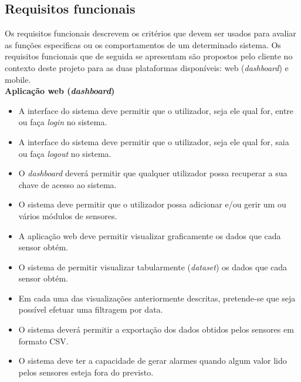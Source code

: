 \subsection{Requisitos funcionais}


Os requisitos funcionais descrevem os critérios que devem ser usados para avaliar as funções especificas ou os comportamentos de um determinado sistema. Os requisitos funcionais que de seguida se apresentam são propostos pelo cliente no contexto deste projeto para as duas plataformas disponíveis: web (\textit{dashboard}) e mobile. \\


\textbf{Aplicação web (\textit{dashboard})}


\begin{itemize}
	\item A interface do sistema deve permitir que o utilizador, seja ele qual for, entre ou faça \textit{login} no sistema. 
	
	\item A interface do sistema deve permitir que o utilizador, seja ele qual for, saia ou faça \textit{logout} no sistema.
	
	\item O \textit{dashboard} deverá permitir que qualquer utilizador possa recuperar a sua chave de acesso ao sistema.

	\item O sistema deve permitir que o utilizador possa adicionar e/ou gerir um ou vários módulos de sensores. 
	
	\item A aplicação web deve permitir visualizar graficamente os dados que cada sensor obtém. 
		
	\item O sistema de permitir visualizar tabularmente (\textit{dataset}) os dados que cada sensor obtém. 
	
	\item Em cada uma das visualizações anteriormente descritas, pretende-se que seja possível efetuar uma filtragem por data.
	
	\item O sistema deverá permitir a exportação dos dados obtidos pelos sensores  em formato \ac{CSV}. 
		
	\item O sistema deve ter a capacidade de gerar alarmes quando algum valor lido pelos sensores esteja fora do previsto. 
	
\end{itemize}


